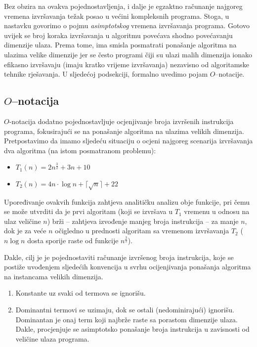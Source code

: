 Bez obzira na ovakva pojednostavljenja, i dalje je egzaktno računanje najgoreg vremena izvršavanja težak posao u većini kompleksnih programa. Stoga, u nastavku govorimo o pojmu \textit{asimptotskog} vremena izvršavanja programa.  Gotovo uvijek se broj koraka izvršavanja u algoritmu povećava shodno povećavanju dimenzije ulaza. Prema tome, ima smisla posmatrati ponašanje algoritma na  
ulazima velike dimenzije jer se često programi čiji su ulazi  malih dimenzija ionako efikasno izvršavaju (imaju kratko vrijeme izvršavanja)  nezavisno od algoritamske tehnike rješavanja. U sljedećoj podsekciji, formalno uvedimo pojam $O$--notacije. 
 
 
\subsection{$O$--notacija} 
$O$-notacija   dodatno pojednostavljuje ocjenjivanje broja izvršenih instrukcija  programa, fokusirajući se na ponašanje algoritma na ulazima velikih dimenzija.  Pretpostavimo da imamo sljedeću situaciju o ocjeni najgoreg scenarija izvršavanja dva algoritma (na istom posmatranom problemu): 
\begin{itemize}
	\item $T_1(n) = 2 n^{\frac{3}{2}} + 3n + 10$
	\item $T_2(n) = 4 n \cdot \log n + \lceil \sqrt{n} \rceil + 22 $
\end{itemize}

Upoređivanje ovakvih funkcija zahtjeva analitičku analizu obje funkcije, pri čemu se može utvrditi da je prvi algoritam (koji se izvršava u $T_1$ vremenu u odnosu na ulaz veličine $n$)  brži -- zahtjeva izvođenje manjeg broja instrukcija -- za manje $n$, dok je za veće $n$ očigledno u prednosti algoritam sa vremenom izvršavanja $T_2$ ($n \log n$ dosta sporije raste od funkcije $n^{\frac{3}{2}}$). 

Dakle, cilj je je pojednostaviti računanje izvršenog broja instrukcija, koje se postiže uvođenjem sljedećih konvencija u svrhu ocijenjivanja ponašanja algoritma na instancama velikih dimenzija.
\begin{enumerate}
	\item Konstante uz svaki od termova se ignorišu.
	\item Dominantni termovi se uzimaju, dok se ostali (nedominirajući) ignorišu. Dominantan je onaj term koji najbrže raste sa porastom dimenzije ulaza. Dakle, procjenjuje se asimptotsko ponašanje broja instrukcija u zavisnosti od veličine ulaza programa. 
\end{enumerate}

